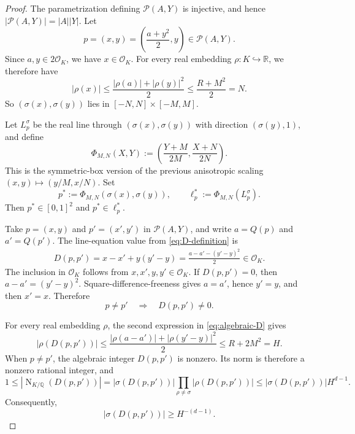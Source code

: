\documentclass[10pt,a4paper]{amsart}
\newcommand{\Norm}{\operatorname{N}}
\newcommand{\OK}{\mathcal{O}_K}
\newcommand{\Q}{\mathbb{Q}}
\newcommand{\R}{\mathbb{R}}
\begin{document}
\begin{proof}
The parametrization defining $\mathcal P(A,Y)$ is injective, and hence
$|\mathcal P(A,Y)|=|A||Y|$. Let
\[
        p=(x,y)
        =\left(\frac{a+y^2}{2},y\right)
        \in\mathcal P(A,Y).
\]
Since $a,y\in2\OK$, we have $x\in\OK$. For every real embedding $\rho:K\hookrightarrow\R$, we therefore have
\[
        |\rho(x)|
        \le\frac{|\rho(a)|+|\rho(y)|^2}{2}
        \le\frac{R+M^2}{2}
        =N.
\]
So $(\sigma(x),\sigma(y))$ lies in
$[-N,N]\times[-M,M]$.

Let $L_p^\sigma$ be the real line through
$(\sigma(x),\sigma(y))$ with direction $(\sigma(y),1)$, and define
\begin{equation}
\label{eq:Phi-MN}
        \Phi_{M,N}(X,Y)
        :=\left(\frac{Y+M}{2M},\frac{X+N}{2N}\right).
\end{equation}
This is the symmetric-box version of the previous anisotropic scaling
$(x,y)\mapsto(y/M,x/N)$.  Set
\begin{equation}
\label{eq:scaled-pairs}
        p^*:=\Phi_{M,N}(\sigma(x),\sigma(y)),
        \qquad
        \ell_p^*:=\Phi_{M,N}(L_p^\sigma).
\end{equation}
Then $p^*\in[0,1]^2$ and $p^*\in\ell_p^*$.

Take $p=(x,y)$ and $p'=(x',y')$ in $\mathcal P(A,Y)$, and write
$a=Q(p)$ and $a'=Q(p')$.  The line-equation value from
\eqref{eq:D-definition} is
\begin{equation}
\label{eq:algebraic-D}
\begin{aligned}
        D(p,p') =x-x'+y(y'-y)=\frac{a-a'-(y'-y)^2}{2}\in\OK.
\end{aligned}
\end{equation}
The inclusion in $\OK$ follows from $x,x',y,y'\in\OK$.  If
$D(p,p')=0$, then $a-a'=(y'-y)^2$. Square-difference-freeness gives $a=a'$, hence $y'=y$, and then
$x'=x$.  Therefore
\begin{equation}
\label{eq:D-nonzero}
        p\ne p'
        \quad\Longrightarrow\quad
        D(p,p')\ne0.
\end{equation}

For every real embedding $\rho$, the second expression in
\eqref{eq:algebraic-D} gives
\[
        |\rho(D(p,p'))|
        \le
        \frac{|\rho(a-a')|+|\rho(y'-y)|^2}{2}
        \le R+2M^2
        =H.
\]
When $p\ne p'$, the algebraic integer $D(p,p')$ is nonzero.  Its norm is
therefore a nonzero rational integer, and
\[
        1
        \le|\Norm_{K/\Q}(D(p,p'))|
        =|\sigma(D(p,p'))|
         \prod_{\rho\ne\sigma}|\rho(D(p,p'))|
        \le|\sigma(D(p,p'))|H^{d-1}.
\]
Consequently,
\begin{equation}
\label{eq:D-lower}
        |\sigma(D(p,p'))|\ge H^{-(d-1)}.
\end{equation}


\end{proof}
\end{document}
